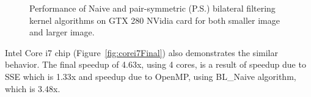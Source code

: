 \documentclass{IEEEtran}
\begin{document}
\begin{figure}[t!]
\begin{centering} 
\end{centering}
\caption{Performance of Naive and pair-symmetric (P.S.) bilateral filtering kernel algorithms on GTX 280 NVidia card for both smaller image and larger image.} 
\label{fig:gpuresults} 
\end{figure} 

Intel Core i7 chip (Figure~\ref{fig:corei7Final}) also demonstrates the similar behavior. The final speedup of 4.63x, using 4 cores, is a result of speedup due to SSE which is 1.33x and speedup due to OpenMP, using BL\_Naive algorithm, which is 3.48x. 
\end{document}
